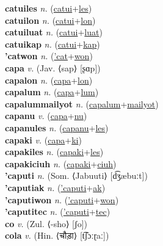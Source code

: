 \textbf{catuiles} \textit{n.} (\hyperref[catui]{catui}+\hyperref[les]{les})
 \label{catuiles} \\
\textbf{catuilon} \textit{n.} (\hyperref[catui]{catui}+\hyperref[lon]{lon})
 \label{catuilon} \\
\textbf{catuiluat} \textit{n.} (\hyperref[catui]{catui}+\hyperref[luat]{luat})
 \label{catuiluat} \\
\textbf{catuikap} \textit{n.} (\hyperref[catui]{catui}+\hyperref[kap]{kap})
 \label{catuikap} \\
\textbf{'catwon} \textit{n.} (\hyperref['cat]{'cat}+\hyperref[won]{won})
 \label{'catwon} \\
\textbf{capa} \textit{v.} (Jav. ⟨sap⟩ [ʂɑp])
 \label{capa} \\
\textbf{capalon} \textit{n.} (\hyperref[capa]{capa}+\hyperref[lon]{lon})
 \label{capalon} \\
\textbf{capalum} \textit{n.} (\hyperref[capa]{capa}+\hyperref[lum]{lum})
 \label{capalum} \\
\textbf{capalummailyot} \textit{n.} (\hyperref[capalum]{capalum}+\hyperref[mailyot]{mailyot})
 \label{capalummailyot} \\
\textbf{capanu} \textit{v.} (\hyperref[capa]{capa}+\hyperref[nu]{nu})
 \label{capanu} \\
\textbf{capanules} \textit{n.} (\hyperref[capanu]{capanu}+\hyperref[les]{les})
 \label{capanules} \\
\textbf{capaki} \textit{v.} (\hyperref[capa]{capa}+\hyperref[ki]{ki})
 \label{capaki} \\
\textbf{capakiles} \textit{n.} (\hyperref[capaki]{capaki}+\hyperref[les]{les})
 \label{capakiles} \\
\textbf{capakiciuh} \textit{n.} (\hyperref[capaki]{capaki}+\hyperref[ciuh]{ciuh})
 \label{capakiciuh} \\
\textbf{'caputi} \textit{n.} (Som. ⟨Jabuuti⟩ [d͡ʒæbuːt])
 \label{'caputi} \\
\textbf{'caputiak} \textit{n.} (\hyperref['caputi]{'caputi}+\hyperref[ak]{ak})
 \label{'caputiak} \\
\textbf{'caputiwon} \textit{n.} (\hyperref['caputi]{'caputi}+\hyperref[won]{won})
 \label{'caputiwon} \\
\textbf{'caputitec} \textit{n.} (\hyperref['caputi]{'caputi}+\hyperref[tec]{tec})
 \label{'caputitec} \\
\textbf{co} \textit{v.} (Zul. ⟨-sho⟩ [ʃo])
 \label{co} \\
\textbf{cola} \textit{v.} (Hin. ⟨चौड़ा⟩ [t͡ʃɔːɽaː])
 \label{cola} \\
